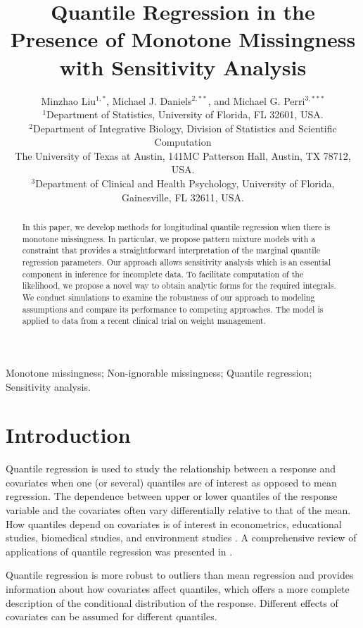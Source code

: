 \documentclass[useAMS,usenatbib,referee]{biom}
\title[Quantile Regression with Missingness]{Quantile Regression in the Presence of Monotone Missingness with Sensitivity Analysis}
\author{Minzhao Liu$^{1,*}$\email{liuminzhao@ufl.edu},
  Michael J. Daniels$^{2,**}$\email{mjdaniels@austin.utexas.edu}, and
Michael G. Perri$^{3,***}$\email{mperri@phhp.ufl.edu} \\
  $^1$Department of Statistics, University of Florida, FL 32601, USA.\\
  $^2$Department of Integrative Biology, Division of Statistics and Scientific
  Computation\\
The University of Texas at Austin, 141MC Patterson Hall,
  Austin, TX 78712, USA.\\
$^3$Department of Clinical and Health Psychology,
 University of Florida, Gainesville, FL 32611, USA.
}
\begin{document}
\date{}

\pagerange{\pageref{firstpage}--\pageref{lastpage}}


\label{firstpage}

\begin{abstract}
  In this paper, we develop methods for longitudinal quantile regression when there is monotone missingness.
  In particular, we propose pattern mixture models with a constraint that provides a straightforward interpretation of the marginal quantile regression parameters.
  Our approach allows sensitivity analysis which is an essential component in inference for incomplete data.
  To facilitate computation of the likelihood, we propose a novel way to obtain analytic forms for the required integrals.  We conduct simulations to examine the robustness of our approach to modeling assumptions and compare its performance to competing approaches.
  The model is applied to data from a recent clinical trial on weight management.
\end{abstract}

\begin{keywords}
  Monotone missingness; Non-ignorable missingness; Quantile regression;
  Sensitivity analysis.
\end{keywords}

\maketitle

\section{Introduction}

Quantile regression is used to study the relationship between a
response and covariates when one (or several) quantiles are of
interest as opposed to mean regression.  The dependence between upper
or lower quantiles of the response variable and the covariates often
vary differentially relative to that of the mean. How quantiles depend
on covariates is of interest in econometrics, educational studies,
biomedical studies, and environment studies \citep{yu2001,
  buchinsky1994,buchinsky1998,he1998, koenker1999,wei2006,yu2003}. A
comprehensive review of applications of quantile regression was
presented in \citet{koenker2005}.

Quantile regression is more robust to outliers than mean regression
and provides information about how covariates affect quantiles, which
offers a more complete description of the conditional distribution of
the response. Different effects of covariates can be assumed for
different quantiles.
\end{document}
